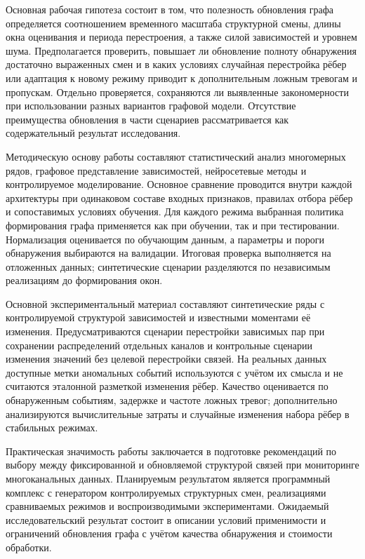 \documentclass[bachelor, och, diploma]{SCWorks}
\begin{document}
Основная рабочая гипотеза состоит в том, что полезность обновления графа определяется соотношением временного масштаба структурной смены, длины окна оценивания и периода перестроения, а также силой зависимостей и уровнем шума. Предполагается проверить, повышает ли обновление полноту обнаружения достаточно выраженных смен и в каких условиях случайная перестройка рёбер или адаптация к новому режиму приводит к дополнительным ложным тревогам и пропускам. Отдельно проверяется, сохраняются ли выявленные закономерности при использовании разных вариантов графовой модели. Отсутствие преимущества обновления в части сценариев рассматривается как содержательный результат исследования.

Методическую основу работы составляют статистический анализ многомерных рядов, графовое представление зависимостей, нейросетевые методы и контролируемое моделирование. Основное сравнение проводится внутри каждой архитектуры при одинаковом составе входных признаков, правилах отбора рёбер и сопоставимых условиях обучения. Для каждого режима выбранная политика формирования графа применяется как при обучении, так и при тестировании. Нормализация оценивается по обучающим данным, а параметры и пороги обнаружения выбираются на валидации. Итоговая проверка выполняется на отложенных данных; синтетические сценарии разделяются по независимым реализациям до формирования окон.

Основной экспериментальный материал составляют синтетические ряды с контролируемой структурой зависимостей и известными моментами её изменения. Предусматриваются сценарии перестройки зависимых пар при сохранении распределений отдельных каналов и контрольные сценарии изменения значений без целевой перестройки связей. На реальных данных доступные метки аномальных событий используются с учётом их смысла и не считаются эталонной разметкой изменения рёбер. Качество оценивается по обнаруженным событиям, задержке и частоте ложных тревог; дополнительно анализируются вычислительные затраты и случайные изменения набора рёбер в стабильных режимах.

Практическая значимость работы заключается в подготовке рекомендаций по выбору между фиксированной и обновляемой структурой связей при мониторинге многоканальных данных. Планируемым результатом является программный комплекс с генератором контролируемых структурных смен, реализациями сравниваемых режимов и воспроизводимыми экспериментами. Ожидаемый исследовательский результат состоит в описании условий применимости и ограничений обновления графа с учётом качества обнаружения и стоимости обработки.
\end{document}
